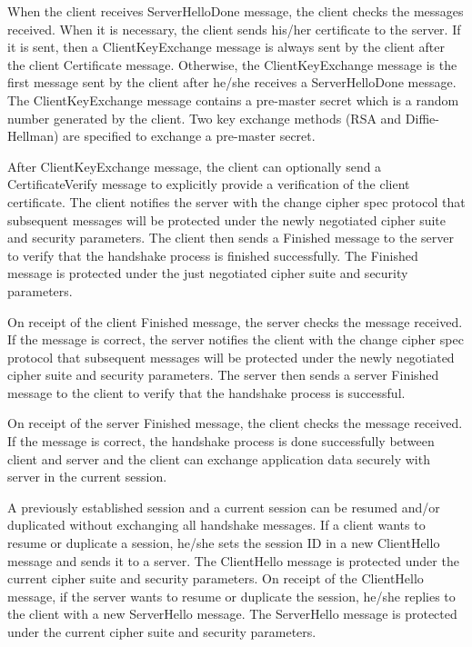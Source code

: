 \documentclass[a4paper,fleqn]{cas-dc}
\begin{document}
When the client receives ServerHelloDone message, the client checks the messages received. When it is necessary, the client sends his/her certificate to the server. If it is sent, then a ClientKeyExchange message is always sent by the client after the client Certificate message. Otherwise, the ClientKeyExchange message is the first message sent by the client after he/she receives a ServerHelloDone message. The ClientKeyExchange message
contains a pre-master secret which is a random number generated by the client. Two key exchange methods (RSA and Diffie-Hellman) are specified to exchange a pre-master secret. 

After ClientKeyExchange message, the client can optionally send a CertificateVerify message to explicitly provide a verification of the client certificate.
The client notifies the server with the change cipher spec protocol that subsequent messages will be protected under the newly negotiated cipher suite and security parameters. The client then sends a Finished message to the server to verify that the handshake process
is finished successfully. The Finished message is protected under the just negotiated cipher suite and security parameters.

On receipt of the client Finished message, the server
checks the message received. If the message is correct, the server notifies the client with the change cipher spec protocol that subsequent messages will be protected under the newly negotiated cipher suite and security parameters. The server then sends a server Finished message to the client to verify that the handshake process is successful.

On receipt of the server Finished message, the client
checks the message received. If the message is correct, the handshake process is done successfully between client and server and the client can exchange application data securely with server in the current session.

A previously established session and a current session
can be resumed and/or duplicated without exchanging all handshake messages. If a client wants to resume or duplicate a session, he/she sets the session ID in a new ClientHello message and sends it to a server. The ClientHello message is protected under the current cipher suite and security parameters. On receipt of the ClientHello message, if the server wants to resume or duplicate the session, he/she replies to the client with a new ServerHello message. The ServerHello message is protected under the current cipher suite and security parameters. 
\end{document}
